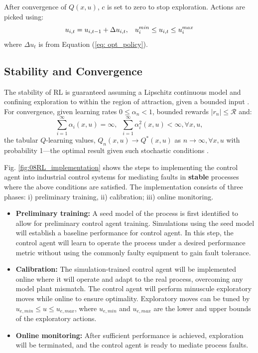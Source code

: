After convergence of $Q(x, u)$, $c$ is set to zero to stop exploration. Actions are picked using:
\begin{equation}
u_{i, t} = u_{i, t - 1} + \Delta u_{i, t}, \hspace*{0.3cm} u_{i}^{min} \leq u_{i, t} \leq u_{i}^{max}
\label{eq:velocity_controller}
\end{equation}
where $\Delta u_t$ is from Equation (\ref{eq: opt_policy}).

\subsection{Stability and Convergence}
The stability of RL is guaranteed assuming a Lipschitz continuous model and confining exploration to within the region of attraction, given a bounded input \cite{stability_rl_ref21}. For convergence, given learning rates $0 \leq \alpha_n < 1$, bounded rewards $|r_n| \leq \mathcal{R}$ and:
\begin{equation}
    \sum\limits^{\infty}_{i = 1}\alpha_i(x, u) = \infty, \; \;  \sum\limits^{\infty}_{i = 1}\alpha_i^2(x, u) < \infty, \forall x, u,
\end{equation}
the tabular $Q$-learning values, $Q_n(x, u) \rightarrow Q^*(x, u)$ as $n \rightarrow \infty, \forall x, u$ with probability 1---the optimal result given such stochastic conditions \cite{convergence_rl_ref20}.

Fig. \ref{fig:08RL_implementation} shows the steps to implementing the control agent into industrial control systems for mediating faults in \textbf{stable} processes where the above conditions are satisfied. The implementation consists of three phases: i) preliminary training, ii) calibration; iii) online monitoring. 

\begin{itemize}
    \item \textbf{Preliminary training:}  A seed model of the process is first identified to allow for preliminary control agent training. Simulations using the seed model will establish a baseline performance for control agent. In this step, the control agent will learn to operate the process under a desired performance metric without using the commonly faulty equipment to gain fault tolerance.
    \item \textbf{Calibration:} The simulation-trained control agent will be implemented online where it will operate and adapt to the real process, overcoming any model plant mismatch. The control agent will perform minuscule exploratory moves while online to ensure optimality.  Exploratory moves can be tuned by $u_{e, min} \leq u \leq u_{e, max}$, where $u_{e, min}$ and $u_{e, max}$ are the lower and upper bounds of the exploratory actions.
    \item \textbf{Online monitoring:} After sufficient performance is achieved, exploration will be terminated, and the control agent is ready to mediate process faults.
\end{itemize}

